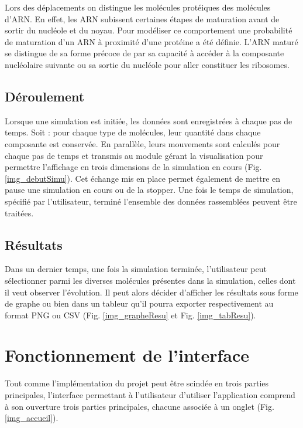 
Lors des déplacements on distingue les molécules protéiques des
molécules d'ARN. En effet, les ARN subissent certaines étapes de
maturation avant de sortir du nucléole et du noyau. Pour modéliser ce
comportement une probabilité de maturation d'un ARN à proximité d'une
protéine a été définie. L'ARN maturé se distingue de sa forme précoce
de par sa capacité à accéder à la composante nucléolaire suivante ou
sa sortie du nucléole pour aller constituer les ribosomes.

\subsection{Déroulement}

Lorsque une simulation est initiée, les données sont enregistrées à
chaque pas de temps. Soit : pour chaque type de molécules, leur
quantité dans chaque composante est conservée. En parallèle, leurs
mouvements sont calculés pour chaque pas de temps et transmis au
module gérant la visualisation pour permettre l'affichage en trois
dimensions de la simulation en cours (Fig. \ref{img_debutSimu}). Cet
échange mis en place permet également de mettre en pause une
simulation en cours ou de la stopper. Une fois le temps de simulation,
spécifié par l'utilisateur, terminé l'ensemble des données rassemblées
peuvent être traitées.

\subsection{Résultats}

Dans un dernier temps, une fois la simulation terminée, l'utilisateur
peut sélectionner parmi les diverses molécules présentes dans la
simulation, celles dont il veut observer l'évolution. Il peut alors
décider d'afficher les résultats sous forme de graphe ou bien dans un
tableur qu'il pourra exporter respectivement au format PNG ou CSV
(Fig. \ref{img_grapheResu} et Fig. \ref{img_tabResu}).

\section{Fonctionnement de l'interface}


Tout comme l'implémentation du projet peut être scindée en trois
parties principales, l'interface permettant à l'utilisateur d'utiliser
l'application comprend à son ouverture trois parties principales,
chacune associée à un onglet (Fig. \ref{img_accueil}).

